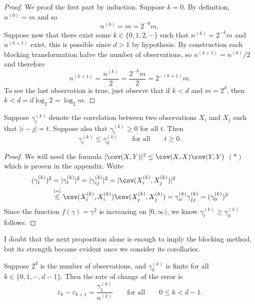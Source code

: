 \documentclass[11pt,english,a4paper]{article}
\begin{document}
\begin{proof}
We proof the first part by induction. Suppose $k=0$. By definition, $n^{(0)} = m$ and so
\[
n^{(0)} = m = 2^{-0} m,
\]
Suppose now that there exist some $k \in \{0,1,2,\cdots\}$ such that $n^{(k)} = 2^{-k}m$ and $n^{(k+1)}$ exist, this is possible since $d > 1$ by hypothesis. By construction each blocking transformation halve the number of observations, so $n^{(k+1)} = n^{(k)}/2$ and therefore
\[
n^{(k+1)} = \frac{n^{(k)}}{2} = \frac{2^{-k}m}{2} = 2^{-(k+1)}m.
\]
To see the last observation is true, just observe that if $k < d$ and $m = 2^d$, then $k < d = d\log_2 2 = \log_2 m$.
\end{proof}
\begin{lemma} Suppose $\gamma_t^{(k)}$ denote the correlation between two observations $X_i$ and $X_j$ such that $|i-j| = t$. Suppose also that $\gamma_t^{(k)} \geq 0$ for all $t$. Then 
\[
\gamma_t^{(k)} \leq \gamma_0^{(k)} \qquad \text{for all} \qquad t \geq 0.
\]
\end{lemma}
\begin{proof}
We will need the formula $| \cov (X,Y) |^2 \leq \cov (X,X) \cov (Y,Y)$ $(*)$ which is proven in the appendix. Write
\begin{align*}
(\gamma_{t}^{(k)})^2 &= |\gamma^{(k)}_t|^2 = |\gamma_{ij}^{(k)}|^2 = | \cov (X^{(k)}_i,X^{(k)}_j) |^2 \\
&\stackrel{(*)}{\leq} \cov (X^{(k)}_i,X^{(k)}_i) \cov (X^{(k)}_j,X^{(k)}_j) = \gamma_{ii}^{(k)}\gamma_{jj}^{(k)} = (\gamma_0^{(k)})^2
\end{align*}
Since the function $f(\gamma) = \gamma^2$ is increasing on $[0,\infty)$, we know $\gamma_t^{(k)} \geq \gamma_0^{(k)}$ follows.
\end{proof}
I doubt that the next proposition alone is enough to imply the blocking method, but its strength become evident once we consider its corollaries.
\begin{prop}
Suppose $2^d$ is the number of observations, and $\gamma^{(k)}_0$ is finite for all $k \in \{ 0,1,\cdots, d-1 \}$. Then the rate of change of the error is
\begin{equation}
\varepsilon_k - \varepsilon_{  k+1} = \frac{\gamma_1^{(k)} }{n^{(k)}} \qquad \text{for all} \qquad 0 \leq k < d-1 \label{eq:rate}.
\end{equation}
\label{prop:diff}
\end{prop}
\end{document}
